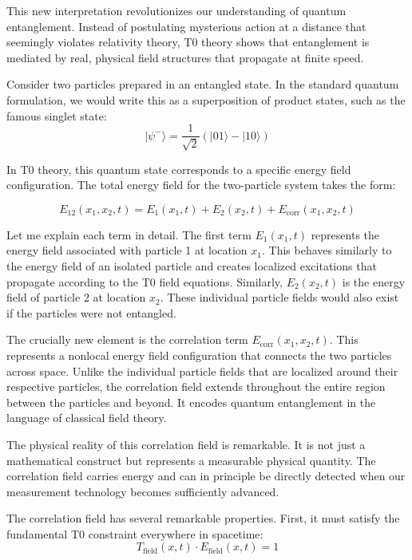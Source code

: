 \documentclass[12pt,a4paper]{article}
\theoremstyle{definition}
\theoremstyle{remark}
\begin{document}
This new interpretation revolutionizes our understanding of quantum entanglement. Instead of postulating mysterious action at a distance that seemingly violates relativity theory, T0 theory shows that entanglement is mediated by real, physical field structures that propagate at finite speed.

Consider two particles prepared in an entangled state. In the standard quantum formulation, we would write this as a superposition of product states, such as the famous singlet state:
$$|\psi^-\rangle = \frac{1}{\sqrt{2}}(|01\rangle - |10\rangle)$$

In T0 theory, this quantum state corresponds to a specific energy field configuration. The total energy field for the two-particle system takes the form:

\begin{equation}
	E_{12}(x_1,x_2,t) = E_1(x_1,t) + E_2(x_2,t) + E_{\text{corr}}(x_1,x_2,t)
	\label{eq:entangled_energy}
\end{equation}

Let me explain each term in detail. The first term $E_1(x_1,t)$ represents the energy field associated with particle 1 at location $x_1$. This behaves similarly to the energy field of an isolated particle and creates localized excitations that propagate according to the T0 field equations. Similarly, $E_2(x_2,t)$ is the energy field of particle 2 at location $x_2$. These individual particle fields would also exist if the particles were not entangled.

The crucially new element is the correlation term $E_{\text{corr}}(x_1,x_2,t)$. This represents a nonlocal energy field configuration that connects the two particles across space. Unlike the individual particle fields that are localized around their respective particles, the correlation field extends throughout the entire region between the particles and beyond. It encodes quantum entanglement in the language of classical field theory.

The physical reality of this correlation field is remarkable. It is not just a mathematical construct but represents a measurable physical quantity. The correlation field carries energy and can in principle be directly detected when our measurement technology becomes sufficiently advanced.

The correlation field has several remarkable properties. First, it must satisfy the fundamental T0 constraint everywhere in spacetime:
$$T_{\text{field}}(x,t) \cdot E_{\text{field}}(x,t) = 1$$
\end{document}

